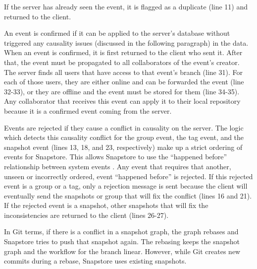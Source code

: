 If the server has already seen the event, it is flagged as a duplicate (line 11) and returned to the client. 

An event is confirmed if it can be applied to the server's database without triggered any causality issues (discussed in the following paragraph) in the data. When an event is confirmed, it is first returned to the client who sent it. After that, the event must be propagated to all collaborators of the event's creator. The server finds all users that have access to that event's branch (line 31). For each of those users, they are either online and can be forwarded the event (line 32-33), or they are offline and the event must be stored for them (line 34-35). Any collaborator that receives this event can apply it to their local repository because it is a confirmed event coming from the server.

Events are rejected if they cause a conflict in causality on the server. The logic which detects this causality conflict for the group event, the tag event, and the snapshot event (lines 13, 18, and 23, respectively) make up a strict ordering of events for Snapstore. This allows Snapstore to use the ``happened before'' relationship between system events \cite{Lamport}. Any event that requires that another, unseen or incorrectly ordered, event ``happened before'' is rejected. If this rejected event is a group or a tag, only a rejection message is sent because the client will eventually send the snapshots or group that will fix the conflict (lines 16 and 21). If the rejected event is a snapshot, other snapshots that will fix the inconsistencies are returned to the client (lines 26-27). 

In Git terms, if there is a conflict in a snapshot graph, the graph rebases and Snapstore tries to push that snapshot again. The rebasing keeps the snapshot graph and the workflow for the branch linear. However, while Git creates new commits during a rebase, Snapstore uses existing snapshots.


